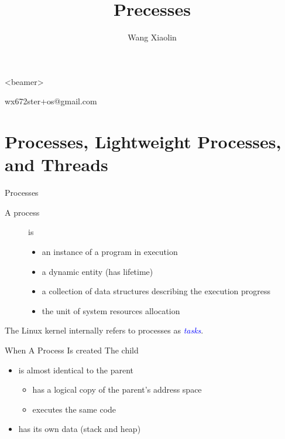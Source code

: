 \begin{frame}<beamer>
  \title{Precesses}
  \author{Wang Xiaolin}
  \titlepage
  \vfill
  \tiny{
     wx672ster+os@gmail.com
  }
\end{frame}

\section{Processes, Lightweight Processes, and Threads}
\label{sec:proc-lightw-proc}

\begin{frame}{Processes}
  \begin{description}
  \item[A process] is
    \begin{itemize}
    \item an instance of a program in execution
    \item a dynamic entity (has lifetime)
    \item a collection of data structures describing the execution progress
    \item the unit of system resources allocation
    \end{itemize}
  \end{description}
  The Linux kernel internally refers to processes as \textcolor{blue}{\emph{tasks}}.
\end{frame}

\begin{frame}{When A Process Is created}
  The child
  \begin{itemize}
  \item is almost identical to the parent
    \begin{itemize}
    \item has a logical copy of the parent's address space
    \item executes the same code
    \end{itemize}
  \item has its own data (stack and heap)
  \end{itemize}
\end{frame}

